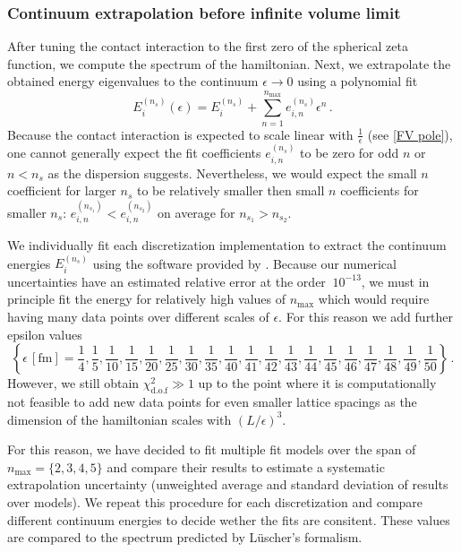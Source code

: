\subsubsection{Continuum extrapolation before infinite volume limit}

After tuning the contact interaction to the first zero of the spherical zeta function, we compute the spectrum of the hamiltonian.
Next, we extrapolate the obtained energy eigenvalues to the continuum $\epsilon \to 0$ using a polynomial fit
\begin{equation}
    E^{(n_s)}_i(\epsilon) = E_i^{(n_s)} + \sum\limits_{n=1}^{n_\mathrm{max}} e_{i,n}^{(n_s)} \epsilon^n \, .
\end{equation}
Because the contact interaction is expected to scale linear with $\frac{1}{\epsilon}$ (see \eqref{FV pole}), one cannot generally expect the fit coefficients $e_{i,n}^{(n_s)}$ to be zero for odd $n$ or $n < n_s$ as the dispersion suggests.
Nevertheless, we would expect the small $n$ coefficient for larger $n_s$ to be relatively smaller then small $n$ coefficients for smaller $n_s$: $e_{i,n}^{(n_{s_1})} < e_{i,n}^{(n_{s_2})}$ on average for $n_{s_1} > n_{s_2}$.

We individually fit each discretization implementation to extract the continuum energies $E_i^{(n_s)}$ using the software provided by \cite{peter_lepage_2016_60221}.
Because our numerical uncertainties have an estimated relative error at the order $~10^{-13}$, we must in principle fit the energy for relatively high values of $n_\mathrm{max}$ which would require having many data points over different scales of $\epsilon$.
For this reason we add further epsilon values
\begin{equation}
	\left\{
		\epsilon \, [\mathrm{fm}] =
		\frac{1}{4}, \frac{1}{5}, \frac{1}{10},
		\frac{1}{15}, \frac{1}{20}, \frac{1}{25},
		\frac{1}{ 30}, \frac{1}{ 35}, \frac{1}{ 40},
		\frac{1}{ 41}, \frac{1}{ 42}, \frac{1}{ 43},
		\frac{1}{ 44}, \frac{1}{45}, \frac{1}{ 46},
		\frac{1}{ 47}, \frac{1}{ 48}, \frac{1}{ 49}, \frac{1}{ 50}
	\right\}
	\, .
\end{equation}
However, we still obtain $\chi^2_{\mathrm{d.o.f}} \gg 1$ up to the point where it is computationally not feasible to add new data points for even smaller lattice spacings as the dimension of the hamiltonian scales with $(L/\epsilon)^3$.

For this reason, we have decided to fit multiple fit models over the span of $n_\mathrm{max} = \{2, 3, 4, 5\}$ and compare their results to estimate a systematic extrapolation uncertainty (unweighted average and standard deviation of results over models).
We repeat this procedure for each discretization and compare different continuum energies to decide wether the fits are consitent.
These values are compared to the spectrum predicted by Lüscher's formalism.

